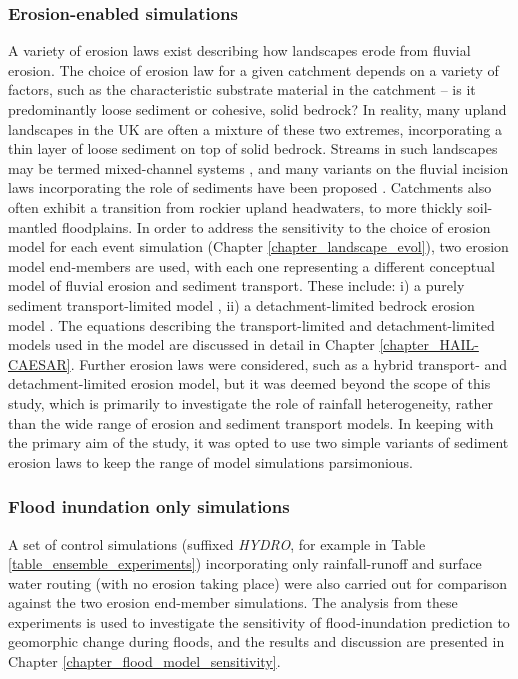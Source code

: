 \subsubsection{Erosion-enabled simulations}
A variety of erosion laws exist describing how landscapes erode from fluvial erosion. The choice of erosion law for a given catchment depends on a variety of factors, such as the characteristic substrate material in the catchment -- is it predominantly loose sediment or cohesive, solid bedrock? In reality, many upland landscapes in the UK are often a mixture of these two extremes, incorporating a thin layer of loose sediment on top of solid bedrock. Streams in such landscapes may be termed mixed-channel systems \citep{howard1998long}, and many variants on the fluvial incision laws incorporating the role of sediments have been proposed \citep{Lague2005,sklar2006role}. Catchments also often exhibit a transition from rockier upland headwaters, to more thickly soil-mantled floodplains. In order to address the sensitivity to the choice of erosion model for each event simulation (Chapter \ref{chapter_landscape_evol}), two erosion model end-members are used, with each one representing a different conceptual model of fluvial erosion and sediment transport. These include: i) a purely sediment transport-limited model \citep{wilcock2003surface}, ii) a detachment-limited bedrock erosion model \citep{howard1983channel,stock1999geologic,whipple1999dynamics}. The equations describing the transport-limited and detachment-limited models used in the model are discussed in detail in Chapter \ref{chapter_HAIL-CAESAR}. Further erosion laws were considered, such as a hybrid transport- and detachment-limited erosion model, but it was deemed beyond the scope of this study, which is primarily to investigate the role of rainfall heterogeneity, rather than the wide range of erosion and sediment transport models. In keeping with the primary aim of the study, it was opted to use two simple variants of sediment erosion laws to keep the range of model simulations parsimonious. 

\subsubsection{Flood inundation only simulations}
A set of control simulations (suffixed \textit{HYDRO}, for example in Table \ref{table_ensemble_experiments}) incorporating only rainfall-runoff and surface water routing (with no erosion taking place) were also carried out for comparison against the two erosion end-member simulations. The analysis from these experiments is used to investigate the sensitivity of flood-inundation prediction to geomorphic change during floods, and the results and discussion are presented in Chapter \ref{chapter_flood_model_sensitivity}.

